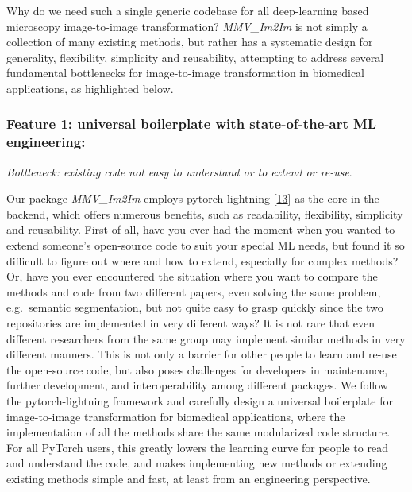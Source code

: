 Why do we need such a single generic codebase for all deep-learning based microscopy image-to-image transformation? \emph{MMV\_Im2Im} is not simply a collection of many existing methods, but rather has a systematic design for generality, flexibility, simplicity and reusability, attempting to address several fundamental bottlenecks for image-to-image transformation in biomedical applications, as highlighted below.

\hypertarget{feature-1-universal-boilerplate-with-state-of-the-art-ml-engineering}{%
\subsubsection{Feature 1: universal boilerplate with state-of-the-art ML engineering:}\label{feature-1-universal-boilerplate-with-state-of-the-art-ml-engineering}}

\emph{Bottleneck: existing code not easy to understand or to extend or re-use}.

Our package \emph{MMV\_Im2Im} employs pytorch-lightning {[}\protect\hyperlink{ref-YbvSvdyB}{13}{]} as the core in the backend, which offers numerous benefits, such as readability, flexibility, simplicity and reusability. First of all, have you ever had the moment when you wanted to extend someone's open-source code to suit your special ML needs, but found it so difficult to figure out where and how to extend, especially for complex methods? Or, have you ever encountered the situation where you want to compare the methods and code from two different papers, even solving the same problem, e.g.~semantic segmentation, but not quite easy to grasp quickly since the two repositories are implemented in very different ways? It is not rare that even different researchers from the same group may implement similar methods in very different manners. This is not only a barrier for other people to learn and re-use the open-source code, but also poses challenges for developers in maintenance, further development, and interoperability among different packages. We follow the pytorch-lightning framework and carefully design a universal boilerplate for image-to-image transformation for biomedical applications, where the implementation of all the methods share the same modularized code structure. For all PyTorch users, this greatly lowers the learning curve for people to read and understand the code, and makes implementing new methods or extending existing methods simple and fast, at least from an engineering perspective.

